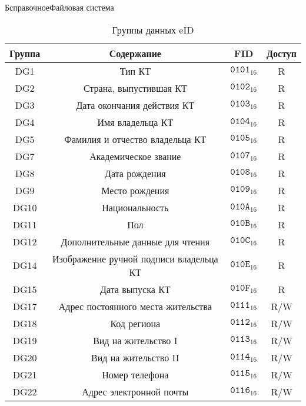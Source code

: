 \begin{appendix}{Б}{справочное}{Файловая система}
\begin{table}[H]
\caption{Группы данных eID}
\label{Table.FILES.DG}
\begin{tabular}{|c|c|c|c|}
\hline
Группа & Содержание & FID & Доступ\\
\hline
\hline
DG1 & Тип КТ & 
$\texttt{0101}_{16}$ & R\\
DG2 & Страна, выпустившая КТ & 
$\texttt{0102}_{16}$ & R\\
DG3 & Дата окончания действия КТ & 
$\texttt{0103}_{16}$ & R\\
DG4 & Имя владельца КТ & 
$\texttt{0104}_{16}$ & R\\
DG5 & Фамилия и отчество владельца КТ & 
$\texttt{0105}_{16}$ & R\\
DG7 & Академическое звание & 
$\texttt{0107}_{16}$ & R\\
DG8 & Дата рождения & 
$\texttt{0108}_{16}$ & R\\
DG9 & Место рождения & 
$\texttt{0109}_{16}$ & R\\
DG10 & Национальность & 
$\texttt{010A}_{16}$ & R\\
DG11 & Пол & 
$\texttt{010B}_{16}$ & R\\
DG12 & Дополнительные данные для чтения & 
$\texttt{010C}_{16}$ & R\\
DG14 & Изображение ручной подписи владельца КТ & 
$\texttt{010E}_{16}$ & R\\
DG15 & Дата выпуска КТ & 
$\texttt{010F}_{16}$ & R\\
DG17 & 	Адрес постоянного места жительства & 
$\texttt{0111}_{16}$ & R/W\\
DG18 & 	Код региона & 
$\texttt{0112}_{16}$ & R/W\\
DG19 & 	Вид на жительство I & 
$\texttt{0113}_{16}$ & R/W\\
DG20 & 	Вид на жительство II & 
$\texttt{0114}_{16}$ & R/W\\
DG21 & 	Номер телефона & 
$\texttt{0115}_{16}$ & R/W\\
DG22 & 	Адрес электронной почты & 
$\texttt{0116}_{16}$ & R/W\\
\hline
\end{tabular}
\end{table}



\end{appendix}
